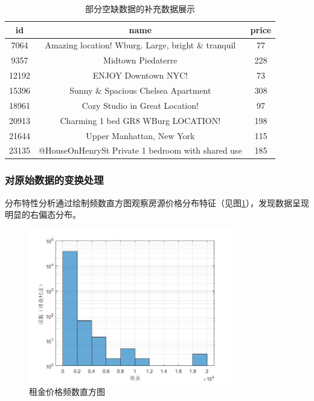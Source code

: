\documentclass[12pt]{article}
\begin{document}
\begin{CJK}{UTF8}{gbsn}
	\begin{table}[H]
		\centering
		\begin{tabular}{ccc}
			\toprule
			id & name & price \\
			\midrule
			7064 & Amazing location! Wburg. Large, bright \& tranquil & 77 \\
			9357 & Midtown Piedaterre & 228 \\
			12192 & ENJOY Downtown NYC! & 73 \\
			15396 & Sunny \& Spacious Chelsea Apartment & 308 \\
			18961 & Cozy Studio in Great Location! & 97 \\
			20913 & Charming 1 bed GR8 WBurg LOCATION! & 198 \\
			21644 & Upper Manhattan, New York & 115 \\
			23135 & @HouseOnHenrySt Private 1 bedroom with shared use & 185 \\
			\bottomrule
		\end{tabular}
		\caption{部分空缺数据的补充数据展示}
		
	\end{table}
	
	
	\subsubsection{对原始数据的变换处理}
	分布特性分析通过绘制频数直方图观察房源价格分布特征（见图\ref{fig:2}），发现数据呈现明显的右偏态分布。
	
	\begin{figure}[htbp]
		\centering
		\includegraphics[width=0.8\textwidth]{pic/2.jpg} %
		\caption{租金价格频数直方图}
		\label{fig:2}
	\end{figure}
	

\end{CJK}
\end{document}
